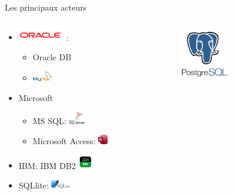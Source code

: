 \documentclass[xetex,dvipsnames]{beamer}
\begin{document}
\begin{frame}{Les principaux acteurs}
    \begin{columns}
    \begin{column}{0.6\textwidth}
	\begin{itemize}
		\item \includegraphics[width=0.3\textwidth]{./figures/oracle.png} :
		\begin{itemize}
			\item Oracle DB 
			\item \includegraphics[width=0.14\textwidth]{./figures/mysql.png}
		\end{itemize}
		\item Microsoft
		\begin{itemize} 
			\item MS SQL: \includegraphics[width=0.12\textwidth]{./figures/mssql.png}
			\item Microsoft Access:  \includegraphics[width=0.07\textwidth]{./figures/access.png}
		\end{itemize}
		\item IBM: IBM DB2 \includegraphics[width=0.09\textwidth]{./figures/IBMDB2.png}
		\item SQLlite: \includegraphics[width=0.12\textwidth]{./figures/sqllite.png}
	\end{itemize}
	    \end{column}
		\begin{column}{0.5\textwidth}
		\begin{center}
	    	\includegraphics[width=0.4\textwidth]{./figures/postgressql.png}

\end{center}
\end{column}
\end{columns}
\end{frame}
\end{document}
